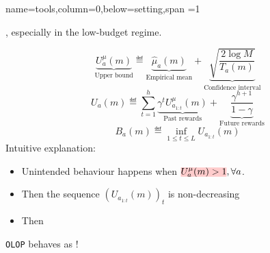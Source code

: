 \documentclass[a0paper,portrait,fontscale=0.35, margin=2cm]{baposter}
\begin{document}
\begin{poster}
{}

{name=tools,column=0,below=setting,span =1}
{

, especially in the low-budget regime.

    \begin{equation}
         \underbrace{U^{\mu}_a(m)}_{\text{Upper bound}} \eqdef \underbrace{\hat{\mu}_a(m)}_{\text{Empirical mean}} + \underbrace{\sqrt{\frac{2 \log M}{T_a(m)}}}_{\text{Confidence interval}}
    \end{equation}
    \begin{equation}
    \label{eq:Ua}
        U_a(m) \eqdef \sum_{t=1}^h \underbrace{\gamma^t U^{\mu}_{a_{1:t}}(m)}_{\text{Past rewards}} + \underbrace{\frac{\gamma^{h+1}}{1-\gamma}}_{\text{Future rewards}}
    \end{equation}
    \begin{equation}
    \label{eq:Ba}
        B_a(m) \eqdef \inf_{1 \leq t \leq L} U_{a_{1:t}}(m)
    \end{equation}
    Intuitive explanation: 
    \begin{itemize}[noitemsep]
        \item Unintended behaviour happens when $\hler{U^{\mu}_a(m) > 1}, \forall a$. 
        \item Then the sequence $(U_{a_{1:t}}(m))_t$ is non-decreasing
        \item Then 
    \end{itemize}

\begin{center}
    
\end{center}

\begin{center}
\texttt{OLOP} behaves as !    
\end{center}
}


\end{poster}
\end{document}
